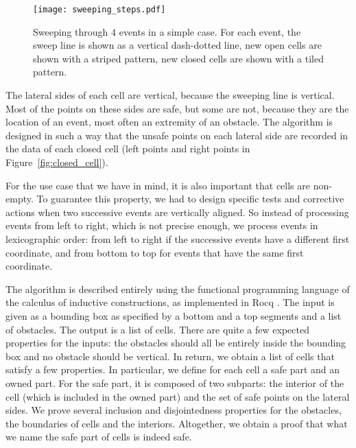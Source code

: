 \documentclass[a4paper, USenglish, cleveref, autoref, thm-restate, final]{lipics-v2021}
\begin{document}
\begin{figure}[h]
\begin{center}
\texttt{[image: sweeping\_steps.pdf]}
\end{center}
\caption{Sweeping through 4 events in a simple case.  For each event,
  the sweep line is shown as a vertical dash-dotted line,
  new open cells are shown with a striped pattern, new closed cells
  are shown with a tiled pattern.}
\label{fig:sweeping_steps}
\end{figure}

The lateral sides of each cell are vertical, because the sweeping line
is vertical.  Most of the points on these sides are safe, but
some are not,
because they are the location of an event, most often an extremity of an
obstacle.  The algorithm is designed in such a way that the unsafe
points on each lateral side are recorded in the data of each closed
cell (left points and right points in Figure~\ref{fig:closed_cell}).

For the use case that we have in mind, it is also important that cells
are non-empty.  To guarantee this property, we had to design specific
tests and corrective actions when two successive events are vertically
aligned.  So instead of processing events from left to right, which is
not precise enough, we process events in lexicographic order: from left to
right if the successive events have a different first coordinate, and
from bottom to top for events that have the same first coordinate.

The algorithm is described entirely using the functional programming
language of the calculus of inductive constructions, as implemented in
Rocq \cite{the_coq_development_team_2024_14542673}.  The input is given as a bounding box as specified by a bottom and
a top segments and a list of obstacles.
The output is a list of cells.  There are quite a few expected
properties for the inputs: the obstacles should all be entirely inside
the bounding box and no obstacle should be vertical.  In return, we
obtain a list of cells that satisfy a few properties.  In particular,
we define for each cell a safe part and an owned part.  For the safe part,
it is composed of two subparts: the interior of the cell (which is included in
the owned part) and the set of safe points on the lateral sides.  We
prove several inclusion and disjointedness properties for the obstacles, the
boundaries of cells and the interiors.  Altogether, we obtain a proof that
what we name the safe part of cells is indeed safe.
\end{document}
